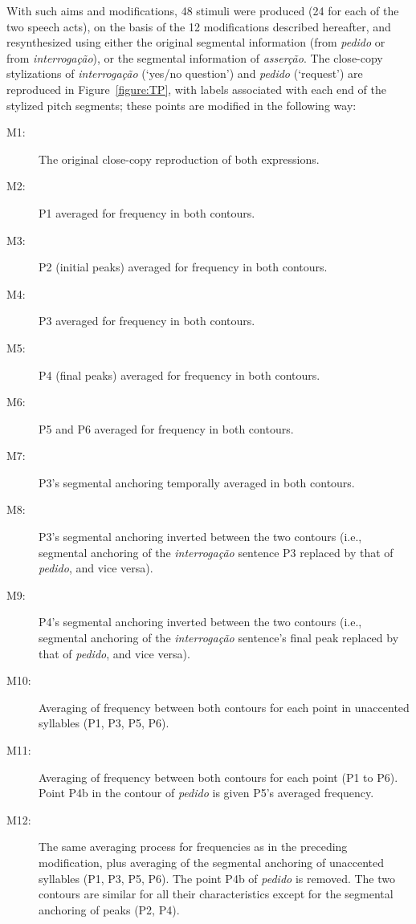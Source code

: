 \documentclass[output=paper]{LSP/langsci}
\begin{document}
With such aims and modifications, 48 stimuli were produced (24 for each of the two speech acts), on the basis of the 12 modifications described hereafter, and resynthesized using either the original segmental information (from \textit{pedido} or from \textit{interrogação}), or the segmental information of \textit{asserção}. 
The close-copy stylizations of \textit{interrogação} (`yes/no question') and \textit{pedido} (`request') are reproduced in Figure~\ref{figure:TP}, with labels associated with each end of the stylized pitch segments; these points are modified in the following way:
\begin{description}
\item [M1:] The original close-copy reproduction of both expressions.
\item [M2:] P1 averaged for frequency in both contours.
\item [M3:] P2 (initial peaks) averaged for frequency in both contours.
\item [M4:] P3 averaged for frequency in both contours.
\item [M5:] P4 (final peaks) averaged for frequency in both contours.
\item [M6:] P5 and P6 averaged for frequency in both contours.
\item [M7:] P3's segmental anchoring temporally averaged in both contours.
\item [M8:] P3's segmental anchoring inverted between the two contours (i.e., segmental anchoring of the \textit{interrogação} sentence P3 replaced by that of \textit{pedido}, and vice versa).
\item [M9:] P4's segmental anchoring inverted between the two contours (i.e., segmental anchoring of the \textit{interrogação} sentence's final peak replaced by that of \textit{pedido}, and vice versa).
\item [M10:] Averaging of frequency between both contours for each point in unaccented syllables (P1, P3, P5, P6).
\item [M11:] Averaging of frequency between both contours for each point (P1 to P6). Point P4b in the contour of \textit{pedido} is given P5's averaged frequency.
\item [M12:] The same averaging process for frequencies as in the preceding modification, plus averaging of the segmental anchoring of unaccented syllables (P1, P3, P5, P6). The point P4b of \textit{pedido} is removed. The two contours are similar for all their characteristics except for the segmental anchoring of peaks (P2, P4).
\end{description}
\end{document}
